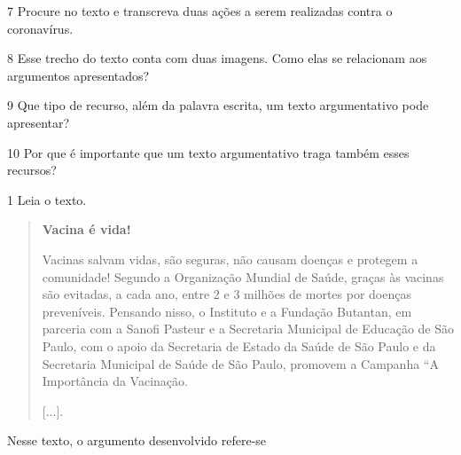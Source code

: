 

\num{7} Procure no texto e transcreva duas ações a serem realizadas contra o
coronavírus.



\num{8} Esse trecho do texto conta com duas imagens. Como elas se
relacionam aos argumentos apresentados?


\pagebreak
\num{9} Que tipo de recurso, além da palavra escrita, um texto argumentativo
pode apresentar?


\num{10} Por que é importante que um texto argumentativo traga também esses recursos?




\num{1} Leia o texto.

\begin{quote}
\textbf{Vacina é vida!}

Vacinas salvam vidas, são seguras, não causam doenças e protegem a
comunidade! Segundo a Organização Mundial de Saúde, graças às vacinas
são evitadas, a cada ano, entre 2 e 3 milhões de mortes por doenças
preveníveis. Pensando nisso, o Instituto e a Fundação Butantan, em
parceria com a Sanofi Pasteur e a Secretaria Municipal de Educação de
São Paulo, com o apoio da Secretaria de Estado da Saúde de São Paulo e
da Secretaria Municipal de Saúde de São Paulo, promovem a Campanha “A
Importância da Vacinação.

{[}...{]}.

\end{quote}

Nesse texto, o argumento desenvolvido refere-se

